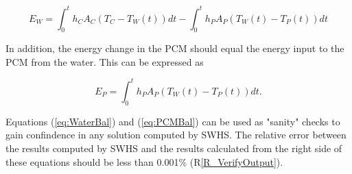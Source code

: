 \documentclass[12pt]{article}
\newcommand{\rref}[1]{R\ref{#1}}
\newcommand{\progname}{SWHS}
\begin{document}
\begin{equation}
E_W = \int_{0}^{t} h_C A_C (T_C - T_W(t)) dt - \int_{0}^{t} h_P A_P (T_W(t) - T_P(t)) dt \label{eq:WaterBal}
\end{equation}

\noindent
In addition, the energy change in the PCM should equal the energy input to 
the PCM from the water. This can be expressed as

\begin{equation}
E_{P} = \int_{0}^{t} h_{P} A_{P} (T_{W}(t) - T_{P}(t)) dt. \label{eq:PCMBal}
\end{equation}

\noindent
Equations (\ref{eq:WaterBal}) and (\ref{eq:PCMBal}) can be used as "sanity" checks
to gain confindence in any solution computed by \progname{}. The relative error 
between the results computed by \progname{} and the results calculated from the
right side of these equations should be less than 0.001\% (\rref{R_VerifyOutput}).
\end{document}
